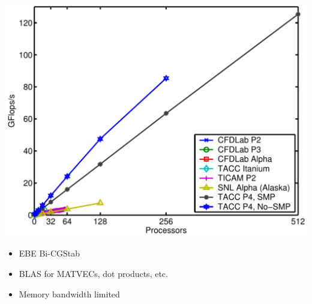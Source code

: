 \documentclass[compress,12pt]{beamer}
\begin{document}
\begin{frame}
{\begin{minipage}{.5\textwidth}
	\includegraphics[width=\textwidth]{figures/scale1}
      \end{minipage}
      \hspace{.02\textwidth}
      \begin{minipage}{.4\textwidth}
	\raggedright
	\begin{itemize}
	\item EBE Bi-CGStab
	\item BLAS for MATVECs, dot products, etc.
	\item Memory bandwidth limited
	\end{itemize}
      \end{minipage}
    }
\end{frame}
\end{document}
